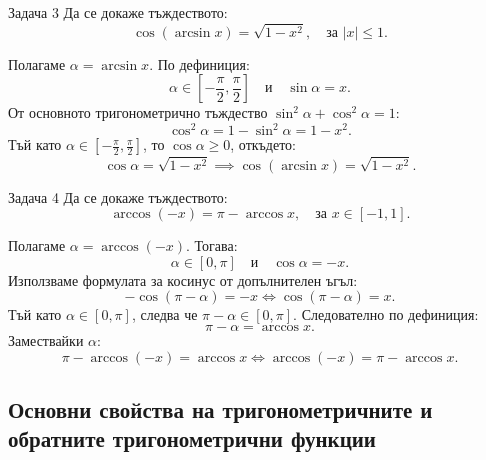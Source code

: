 \begin{problembox}{Задача 3}
Да се докаже тъждеството:
\[
\cos(\arcsin x) = \sqrt{1-x^2}, \quad \text{за } |x| \le 1.
\]
\end{problembox}

\begin{solution}
Полагаме $\alpha = \arcsin x$. По дефиниция:
\[
\alpha \in \left[-\frac{\pi}{2}, \frac{\pi}{2}\right] \quad \text{и} \quad \sin\alpha = x.
\]
От основното тригонометрично тъждество $\sin^2\alpha + \cos^2\alpha = 1$:
\[
\cos^2\alpha = 1 - \sin^2\alpha = 1 - x^2.
\]
Тъй като $\alpha \in \left[-\frac{\pi}{2}, \frac{\pi}{2}\right]$, то $\cos\alpha \ge 0$, откъдето:
\[
\cos\alpha = \sqrt{1-x^2} \implies \cos(\arcsin x) = \sqrt{1-x^2}.
\]
\end{solution}

\begin{problembox}{Задача 4}
Да се докаже тъждеството:
\[
\arccos(-x) = \pi - \arccos x, \quad \text{за } x \in [-1, 1].
\]
\end{problembox}

\begin{solution}
Полагаме $\alpha = \arccos(-x)$. Тогава:
\[
\alpha \in [0, \pi] \quad \text{и} \quad \cos\alpha = -x.
\]
Използваме формулата за косинус от допълнителен ъгъл:
\[
-\cos(\pi - \alpha) = -x \iff \cos(\pi - \alpha) = x.
\]
Тъй като $\alpha \in [0, \pi]$, следва че $\pi - \alpha \in [0, \pi]$. Следователно по дефиниция:
\[
\pi - \alpha = \arccos x.
\]
Замествайки $\alpha$:
\[
\pi - \arccos(-x) = \arccos x \iff \arccos(-x) = \pi - \arccos x.
\]
\end{solution}


\subsection*{Основни свойства на тригонометричните и обратните тригонометрични функции}

